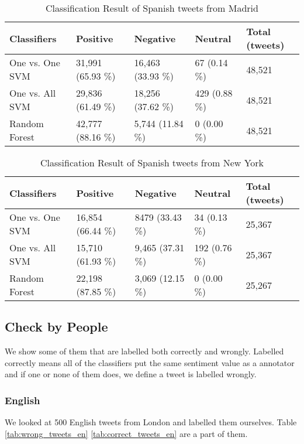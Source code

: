 \begin{table}[ht]
	\caption{Classification Result of Spanish tweets from Madrid}
	\begin{tabular}{|l|p{1.8cm}|p{1.8cm}|p{1.8cm}|p{1.8cm}|} \hline
	Classifiers & Positive & Negative & Neutral & Total (tweets)\\ \hline
One vs. One SVM & 31,991 (65.93 \%) & 16,463 (33.93 \%)& 67 (0.14 \%)& 48,521 \\ \hline
One vs. All SVM & 29,836 (61.49 \%)& 18,256 (37.62 \%)& 429 (0.88 \%)& 48,521 \\ \hline
Random Forest   & 42,777 (88.16 \%)& 5,744 (11.84 \%) & 0 (0.00 \%)  & 48,521 \\ \hline
	\end{tabular}
	\label{tab:result_madrid_es}
\end{table}

\begin{table}[ht]
	\caption{Classification Result of Spanish tweets from New York}
	\begin{tabular}{|l|p{1.8cm}|p{1.8cm}|p{1.8cm}|p{1.8cm}|} \hline
	Classifiers & Positive & Negative & Neutral & Total (tweets)\\ \hline
One vs. One SVM & 16,854 (66.44 \%)& 8479 (33.43 \%)& 34 (0.13 \%) & 25,367 \\ \hline
One vs. All SVM & 15,710 (61.93 \%)& 9,465 (37.31 \%)& 192 (0.76 \%)& 25,367 \\ \hline
Random Forest   & 22,198 (87.85 \%)& 3,069 (12.15 \%)& 0 (0.00 \%)  & 25,267 \\ \hline
	\end{tabular}
	\label{tab:result_ny_es}
\end{table}


\begin{comment}
London
N.Y or San Francisco

\end{comment}

\subsection{Check by People}
We show some of them that are labelled both correctly and wrongly.
Labelled correctly means all of the classifiers put the same sentiment value as a annotator and if one or none of them does, we define a tweet is labelled wrongly.
\subsubsection{English}
We looked at 500 English tweets from London and labelled them ourselves.
Table \ref{tab:wrong_tweets_en} \ref{tab:correct_tweets_en} are a part of them.


